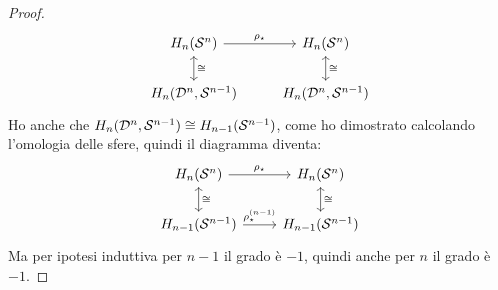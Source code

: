 \begin{proof}
\[\begin{tikzcd}
      H_n(\Sph{n}) \rar{\rho_\star} \arrow[leftrightarrow]{d}{\cong} & H_n(\Sph{n})  \arrow[leftrightarrow]{d}{\cong} \\
      H_n(\Disk{n}, \Sph{n-1}) &  H_n(\Disk{n}, \Sph{n-1})
    \end{tikzcd}
  \]
  Ho anche che $ H_n(\mathcal{D}^{n}, \mathcal{S}^{n-1}) \cong H_{n-1}(\mathcal{S}^{n-1}) $, come ho dimostrato
  calcolando l'omologia delle sfere, quindi il diagramma diventa:
  \[
    \begin{tikzcd}
      H_n(\Sph{n}) \rar{\rho_\star} \arrow[leftrightarrow]{d}{\cong} & H_n(\Sph{n})  \arrow[leftrightarrow]{d}{\cong} \\
      H_{n-1}(\Sph{n-1}) \rar{\rho_\star^{(n-1)}} &  H_{n-1}(\Sph{n-1})
    \end{tikzcd}
  \]
  Ma per ipotesi induttiva per $ n - 1 $ il grado è $ - 1 $, quindi anche per $ n $ il grado è $ - 1 $.
\end{proof}
\eproof







